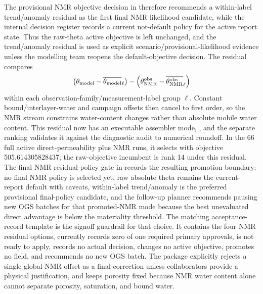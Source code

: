 The provisional NMR objective decision in
 therefore recommends a
within-label trend/anomaly residual as the first final NMR likelihood candidate,
while the internal decision register records a current not-default policy for the
active report state.  Thus the raw-theta active objective is left unchanged, and the
trend/anomaly residual is used as explicit scenario/provisional-likelihood evidence
unless the modelling team reopens the default-objective decision.  The residual compares
\[
\left(\theta_{\rm model}-\overline{\theta_{\rm model}}_{\ell}\right)
-
\left(\theta_{\rm NMR}^{\rm obs}-\overline{\theta_{\rm NMR}^{\rm obs}}_{\ell}\right)
\]
within each observation-family/measurement-label group \(\ell\).  Constant
bound/interlayer-water and campaign offsets then cancel to first order, so the NMR
stream constrains water-content changes rather than absolute mobile water content.
This residual now has an executable assembler mode,
 , and the separate
 ranking validates it
against the diagnostic audit to numerical roundoff.  In the 66 full active
direct-permeability plus NMR runs, it selects
 with objective 505.614305828437; the
raw-objective incumbent is rank 14 under this residual.
The final NMR residual-policy gate in
 records the resulting
promotion boundary: no final NMR policy is selected yet, raw absolute theta remains
the current-report default with caveats, within-label trend/anomaly is the preferred
provisional final-policy candidate, and the follow-up planner recommends pausing new
OGS batches for that promoted-NMR mode because the best unevaluated direct advantage
is below the materiality threshold.
The matching acceptance-record template
is the signoff guardrail for that choice.  It contains the four NMR residual
options, currently records zero of one required primary approvals, is not ready to
apply, records no actual decision, changes no active objective, promotes no field,
and recommends no new OGS batch.
The package explicitly rejects a single global NMR offset as a final correction
unless collaborators provide a physical justification, and keeps porosity fixed
because NMR water content alone cannot separate porosity, saturation, and bound
water.

